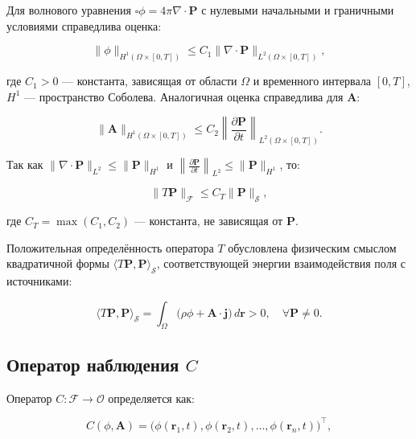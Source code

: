 \documentclass[sn-mathphys-num]{bst/sn-jnl}
\theoremstyle{thmstylethree}
\theoremstyle{thmstyletwo}
\theoremstyle{thmstyleone}
\begin{document}
Для волнового уравнения $\square \phi = 4\pi \nabla \cdot \mathbf{P}$ с нулевыми начальными и граничными условиями справедлива оценка:

\begin{equation}
    \|\phi\|_{H^1(\Omega \times [0,T])} \leq C_1 \|\nabla \cdot \mathbf{P}\|_{L^2(\Omega \times [0,T])},
\end{equation}

где $C_1 > 0$ --- константа, зависящая от области $\Omega$ и временного интервала $[0,T]$, $H^1$ --- пространство Соболева. Аналогичная оценка справедлива для $\mathbf{A}$:

\begin{equation}
    \|\mathbf{A}\|_{H^1(\Omega \times [0,T])} \leq C_2 \left\|\frac{\partial \mathbf{P}}{\partial t}\right\|_{L^2(\Omega \times [0,T])}.
\end{equation}

Так как $\|\nabla \cdot \mathbf{P}\|_{L^2} \leq \|\mathbf{P}\|_{H^1}$ и $\left\|\frac{\partial \mathbf{P}}{\partial t}\right\|_{L^2} \leq \|\mathbf{P}\|_{H^1}$, то:

\begin{equation}
    \|T\mathbf{P}\|_{\mathcal{F}} \leq C_T \|\mathbf{P}\|_{\mathcal{S}},
\end{equation}

где $C_T = \max(C_1, C_2)$ --- константа, не зависящая от $\mathbf{P}$.

Положительная определённость оператора $T$ обусловлена физическим смыслом квадратичной формы $\langle T\mathbf{P}, \mathbf{P} \rangle_{\mathcal{S}}$, соответствующей энергии взаимодействия поля с источниками:

\begin{equation}
    \langle T\mathbf{P}, \mathbf{P} \rangle_{\mathcal{S}} = \int_\Omega \bigl(\rho \phi + \mathbf{A} \cdot \mathbf{j}\bigr) \, d\mathbf{r} > 0, \quad \forall \mathbf{P} \neq 0.
\end{equation}

\subsection{Оператор наблюдения $C$}
Оператор $C: \mathcal{F} \to \mathcal{O}$ определяется как:

\begin{equation}
    C(\phi, \mathbf{A}) = \bigl(\phi(\mathbf{r}_1, t), \phi(\mathbf{r}_2, t), \dots, \phi(\mathbf{r}_n, t)\bigr)^\top,
\end{equation}
\end{document}
